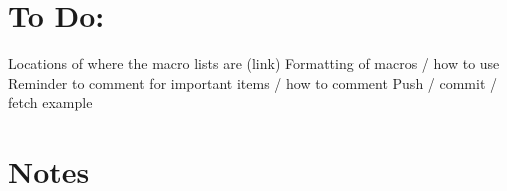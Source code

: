 

\section*{To Do:}
Locations of where the macro lists are (link)
Formatting of macros / how to use
Reminder to comment for important items / how to comment
Push / commit / fetch example

\section*{Notes}


